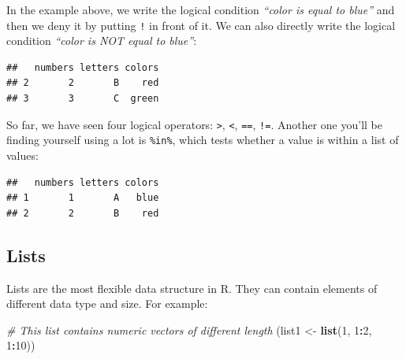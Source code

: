 \documentclass[
]{book}
\newenvironment{Shaded}{\begin{snugshade}}{\end{snugshade}}
\newcommand{\CommentTok}[1]{\textcolor[rgb]{0.56,0.35,0.01}{\textit{#1}}}
\newcommand{\DecValTok}[1]{\textcolor[rgb]{0.00,0.00,0.81}{#1}}
\newcommand{\FunctionTok}[1]{\textcolor[rgb]{0.13,0.29,0.53}{\textbf{#1}}}
\newcommand{\NormalTok}[1]{#1}
\newcommand{\OtherTok}[1]{\textcolor[rgb]{0.56,0.35,0.01}{#1}}
\newcommand{\SpecialCharTok}[1]{\textcolor[rgb]{0.81,0.36,0.00}{\textbf{#1}}}
\newcommand{\StringTok}[1]{\textcolor[rgb]{0.31,0.60,0.02}{#1}}
\begin{document}
In the example above, we write the logical condition \emph{``color is equal to blue''}
and then we deny it by putting \texttt{!} in front of it. We can also directly write
the logical condition \emph{``color is NOT equal to blue''}:

\begin{Shaded}
\end{Shaded}

\begin{verbatim}
##   numbers letters colors
## 2       2       B    red
## 3       3       C  green
\end{verbatim}

So far, we have seen four logical operators: \texttt{\textgreater{}}, \texttt{\textless{}}, \texttt{==}, \texttt{!=}. Another one
you'll be finding yourself using a lot is \texttt{\%in\%}, which tests whether a value is
within a list of values:

\begin{Shaded}
\end{Shaded}

\begin{verbatim}
##   numbers letters colors
## 1       1       A   blue
## 2       2       B    red
\end{verbatim}

\hypertarget{lists}{%
\subsection{Lists}\label{lists}}

Lists are the most flexible data structure in R. They can contain elements of
different data type and size. For example:

\begin{Shaded}
\begin{Highlighting}[]
\CommentTok{\# This list contains numeric vectors of different length}
\NormalTok{(list1 }\OtherTok{\textless{}{-}} \FunctionTok{list}\NormalTok{(}\DecValTok{1}\NormalTok{, }\DecValTok{1}\SpecialCharTok{:}\DecValTok{2}\NormalTok{, }\DecValTok{1}\SpecialCharTok{:}\DecValTok{10}\NormalTok{))}
\end{Highlighting}
\end{Shaded}
\end{document}
